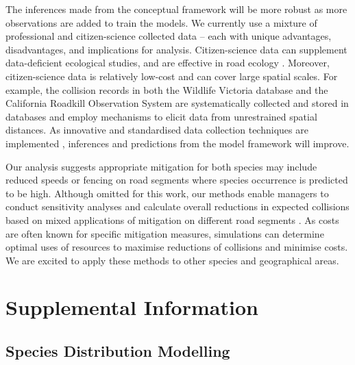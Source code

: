 The inferences made from the conceptual framework will be more robust as more observations are added to train the models.  We currently use a mixture of professional and citizen-science collected data -- each with unique advantages, disadvantages, and implications for analysis.  Citizen-science data can supplement data-deficient ecological studies, and are effective in road ecology \citep{paul14}.  Moreover, citizen-science data is relatively low-cost and can cover large spatial scales.  For example, the collision records in both the Wildlife Victoria database and the California Roadkill Observation System are systematically collected and stored in databases and employ mechanisms to elicit data from unrestrained spatial distances.  As innovative and standardised data collection techniques are implemented \citep[see][]{aane09,dona10,shil15b}, inferences and predictions from the model framework will improve.

Our analysis suggests appropriate mitigation for both species may include reduced speeds or fencing on road segments where species occurrence is predicted to be high.  Although omitted for this work, our methods enable managers to conduct sensitivity analyses and calculate overall reductions in expected collisions based on mixed applications of mitigation on different road segments \citep[assuming the mitigation is 100\% effective, but see][]{huij09}.  As costs are often known for specific mitigation measures, simulations can determine optimal uses of resources to maximise reductions of collisions and minimise costs. We are excited to apply these methods to other species and geographical areas.

\section{Supplemental Information}\label{isec:occ}

\subsection{Species Distribution Modelling}

